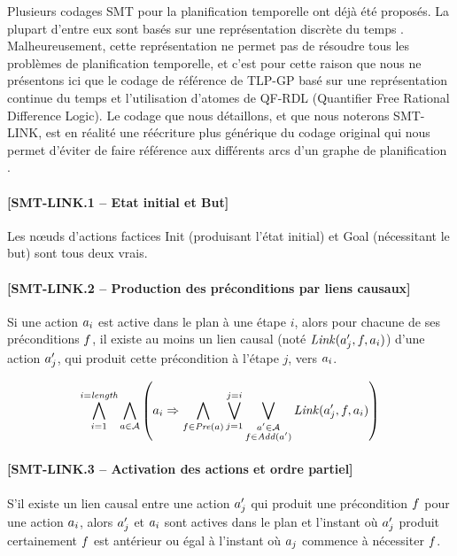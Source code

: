 %
%

Plusieurs codages SMT pour la planification temporelle ont déjà été proposés. La plupart d'entre eux sont basés sur une représentation discrète du temps \cite{DBLP:journals/ai/ShinD05,DBLP:conf/aaai/Rintanen15}. Malheureusement, cette représentation ne permet pas de résoudre tous les problèmes de planification temporelle, et c'est pour cette raison que nous ne présentons ici que le codage de référence de TLP-GP \cite{DBLP:conf/ictai/MarisR08} basé sur une représentation continue du temps et l'utilisation d'atomes de QF-RDL (Quantifier Free Rational Difference Logic). Le codage que nous détaillons, et que nous noterons SMT-LINK, est en réalité une réécriture plus générique du codage original qui nous permet d'éviter de faire référence aux différents arcs d'un graphe de planification \cite{BF95,BF97}.

\paragraph*{[SMT-LINK.1 -- Etat initial et But]}

Les nœuds d'actions factices Init (produisant l'état initial) et Goal (nécessitant le but) sont tous deux vrais.

\paragraph*{[SMT-LINK.2 -- Production des préconditions par liens causaux]}

Si une action $a_{i}$ est active dans le plan à une étape $i$, alors pour chacune de ses préconditions $f$, il existe au moins un lien causal (noté $\mathit{Link}(a'_{j},f,a_{i})$) d'une action $a'_{j}$, qui produit cette précondition à l'étape $j$, vers $a_{i}$.

\[ \bigwedge\limits_{\substack{i=1}}^{i=\textit{length}} \bigwedge\limits_{\substack{a\in\mathcal{A}}} \left( a_{i} \Rightarrow \bigwedge\limits_{\substack{f\in\mathit{Pre}(a)}} \bigvee\limits_{\substack{j=1}}^{j=i}\bigvee\limits_{\substack{a'\in\mathcal{A}\\f\in\mathit{Add}(a')}} \mathit{Link}(a'_{j},f,a_{i}) \right)
\]

\paragraph*{[SMT-LINK.3 -- Activation des actions et ordre partiel]}

S’il existe un lien causal entre une action $a'_{j}$ qui produit une précondition $f$ pour une action $a_{i}$, alors $a'_{j}$ et $a_{i}$ sont actives dans le plan et l’instant où $a'_{j}$ produit certainement $f$ est antérieur ou égal à l’instant où $a_{j}$ commence à nécessiter $f$.

